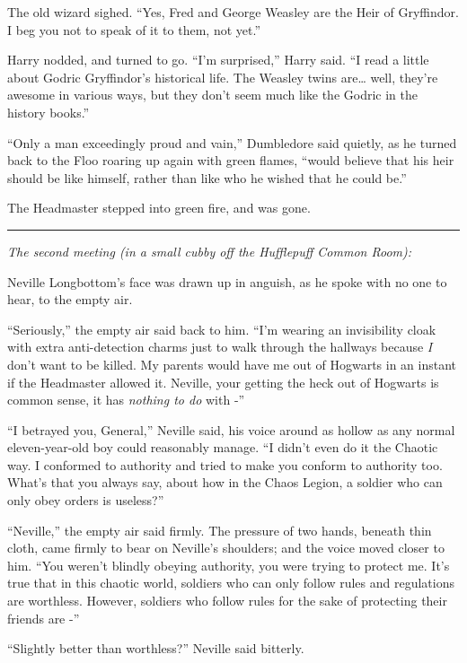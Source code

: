 The old wizard sighed. ``Yes, Fred and George Weasley are the Heir of
Gryffindor. I beg you not to speak of it to them, not yet.''

Harry nodded, and turned to go. ``I'm surprised,'' Harry said. ``I read
a little about Godric Gryffindor's historical life. The Weasley twins
are\ldots{} well, they're awesome in various ways, but they don't seem
much like the Godric in the history books.''

``Only a man exceedingly proud and vain,'' Dumbledore said quietly, as
he turned back to the Floo roaring up again with green flames, ``would
believe that his heir should be like himself, rather than like who he
wished that he could be.''

The Headmaster stepped into green fire, and was gone.

\begin{center}\rule{3in}{0.4pt}\end{center}

\emph{The second meeting (in a small cubby off the Hufflepuff Common
Room):}

Neville Longbottom's face was drawn up in anguish, as he spoke with no
one to hear, to the empty air.

``Seriously,'' the empty air said back to him. ``I'm wearing an
invisibility cloak with extra anti-detection charms just to walk through
the hallways because \emph{I} don't want to be killed. My parents would
have me out of Hogwarts in an instant if the Headmaster allowed it.
Neville, your getting the heck out of Hogwarts is common sense, it has
\emph{nothing to do} with -''

``I betrayed you, General,'' Neville said, his voice around as hollow as
any normal eleven-year-old boy could reasonably manage. ``I didn't even
do it the Chaotic way. I conformed to authority and tried to make you
conform to authority too. What's that you always say, about how in the
Chaos Legion, a soldier who can only obey orders is useless?''

``Neville,'' the empty air said firmly. The pressure of two hands,
beneath thin cloth, came firmly to bear on Neville's shoulders; and the
voice moved closer to him. ``You weren't blindly obeying authority, you
were trying to protect me. It's true that in this chaotic world,
soldiers who can only follow rules and regulations are worthless.
However, soldiers who follow rules for the sake of protecting their
friends are -''

``Slightly better than worthless?'' Neville said bitterly.

